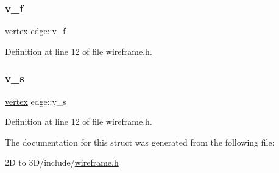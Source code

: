 \subsubsection{\texorpdfstring{v\+\_\+f}{v\_f}}
{\footnotesize\ttfamily \mbox{\hyperlink{structvertex}{vertex}} edge\+::v\+\_\+f}



Definition at line 12 of file wireframe.\+h.

\mbox{\label{structedge_af7596e53bed95953f5e0ce38d82a1b3a}} 
\subsubsection{\texorpdfstring{v\+\_\+s}{v\_s}}
{\footnotesize\ttfamily \mbox{\hyperlink{structvertex}{vertex}} edge\+::v\+\_\+s}



Definition at line 12 of file wireframe.\+h.



The documentation for this struct was generated from the following file\+:\begin{DoxyCompactItemize}
\item 
2\+D to 3\+D/include/\mbox{\hyperlink{wireframe_8h}{wireframe.\+h}}\end{DoxyCompactItemize}
